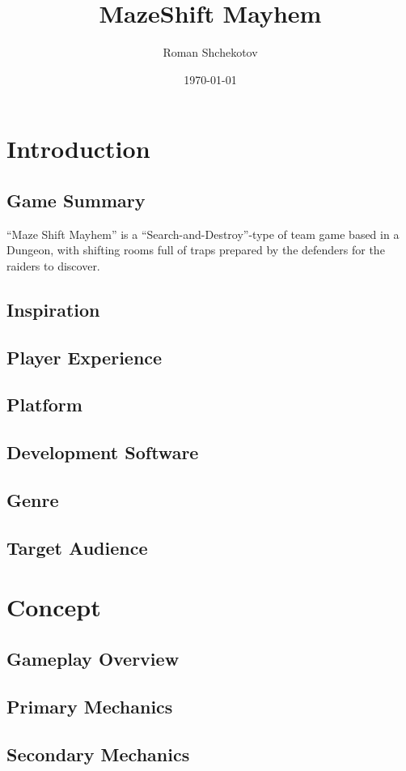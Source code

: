 \documentclass[a4paper,12pt]{article}
\title{MazeShift Mayhem}
\author{Roman Shchekotov}
\date{\today}
\begin{document}
  \maketitle
  \tableofcontents

  \section{Introduction}
  \subsection{Game Summary}
  ``Maze Shift Mayhem'' is a ``Search-and-Destroy''-type of team game based
  in a Dungeon, with shifting rooms full of traps prepared by the defenders
  for the raiders to discover.
  \subsection{Inspiration}
  \subsection{Player Experience}
  \subsection{Platform}
  \subsection{Development Software}
  \subsection{Genre}
  \subsection{Target Audience}
  \section{Concept}
  \subsection{Gameplay Overview}
  \subsection{Primary Mechanics}
  \subsection{Secondary Mechanics}
\end{document}
